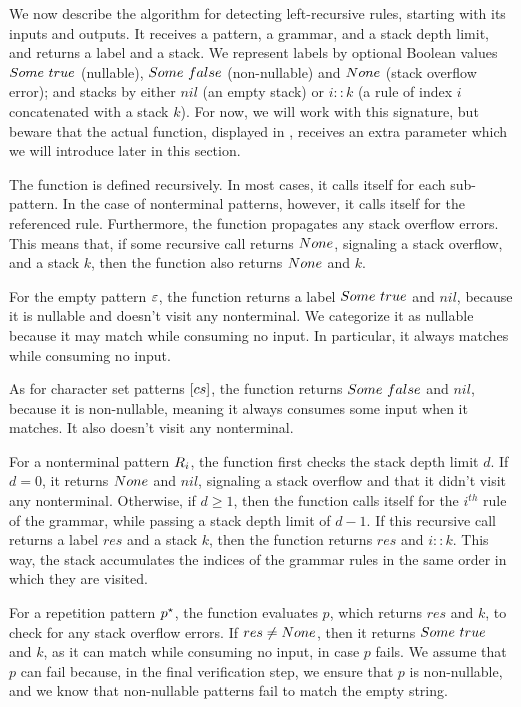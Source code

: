 We now describe the algorithm
for detecting left-recursive rules,
starting with its inputs and outputs.
It receives a pattern, a grammar, and a stack depth limit,
and returns a label and a stack.
We represent labels by
optional Boolean values
$Some\ true$ (nullable),
$Some\ false$ (non-nullable) and
$None$ (stack overflow error);
and stacks by either
$nil$ (an empty stack) or
$i :: k$ (a rule of index $i$ concatenated with a stack $k$).
For now, we will work with this signature,
but beware that the actual function,
displayed in ,
receives an extra parameter
which we will introduce later in this section.

The function is defined recursively.
In most cases, it calls itself for each sub-pattern.
In the case of nonterminal patterns, however,
it calls itself for the referenced rule.
Furthermore, the function propagates any stack overflow errors.
This means that,
if some recursive call returns $None$,
signaling a stack overflow,
and a stack $k$,
then the function also returns $None$ and $k$.

For the empty pattern $\varepsilon$,
the function returns a label $Some\ true$ and $nil$,
because it is nullable and doesn't visit any nonterminal.
We categorize it as nullable because it may match while consuming no input.
In particular, it always matches while consuming no input.

As for character set patterns $[cs]$,
the function returns $Some\ false$ and $nil$,
because it is non-nullable,
meaning it always consumes some input when it matches.
It also doesn't visit any nonterminal.

For a nonterminal pattern $R_{i}$,
the function first checks the stack depth limit $d$.
If $d=0$, it returns $None$ and $nil$,
signaling a stack overflow
and that it didn't visit any nonterminal.
Otherwise, if $d\ge1$,
then the function calls itself for the $i^{th}$ rule of the grammar,
while passing a stack depth limit of $d-1$.
If this recursive call returns a label $res$ and a stack $k$,
then the function returns $res$ and $i :: k$.
This way, the stack accumulates
the indices of the grammar rules
in the same order in which they are visited.

For a repetition pattern $p^\star$,
the function evaluates $p$,
which returns $res$ and $k$,
to check for any stack overflow errors.
If $res\ne None$,
then it returns $Some\ true$ and $k$,
as it can match while consuming no input,
in case $p$ fails.
We assume that $p$ can fail because,
in the final verification step,
we ensure that $p$ is non-nullable,
and we know that non-nullable patterns
fail to match the empty string.

